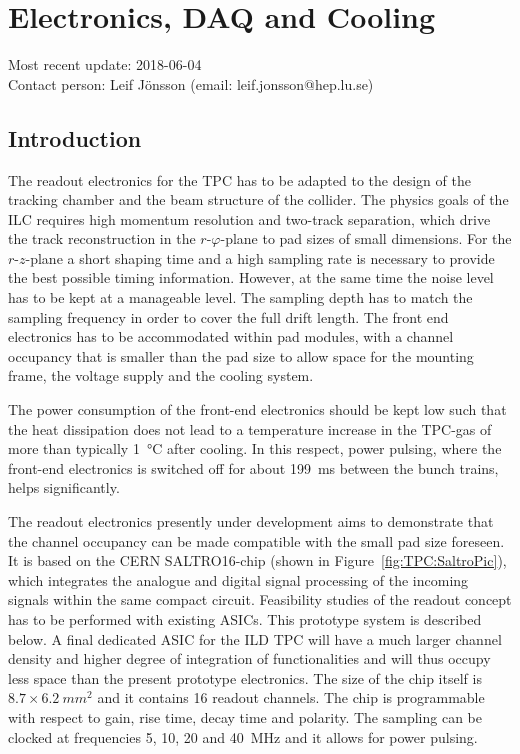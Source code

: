\section{Electronics, DAQ and Cooling}
\label{chap:TPC_sec:electronics}
Most recent update: 2018-06-04 \\
Contact person: Leif J{\"o}nsson (email: leif.jonsson@hep.lu.se)

\subsection{Introduction}
The readout electronics for the TPC has to be adapted to the design of the tracking chamber and the beam structure of the collider. The physics goals of the ILC requires high momentum resolution and two-track separation, which drive the track reconstruction in the $r\text{-}\varphi$-plane to pad sizes of small dimensions. For the $r\text{-}z$-plane a short shaping time and a high sampling rate is necessary to provide the best possible timing information. However, at the same time the noise level has to be kept at a manageable level. The sampling depth has to match the sampling frequency in order to cover the full drift length. The front end electronics has to be accommodated within pad modules, with a channel occupancy that is smaller than the pad size to allow space for the mounting frame, the voltage supply and the cooling system.

The power consumption of the front-end electronics should be kept low such that the heat dissipation does not lead to a temperature increase in the TPC-gas of more than typically \SI{1}{\degreeCelsius} after cooling. In this respect, power pulsing, where the front-end electronics is switched off for about \SI{199}{ms} between the bunch trains, helps significantly.

The readout electronics presently under development aims to demonstrate that the channel occupancy can be made compatible with the small pad size foreseen. It is based on the CERN SALTRO16-chip (shown in Figure~\ref{fig:TPC:SaltroPic}), which integrates the analogue and digital signal processing of the incoming signals within the same compact circuit. Feasibility studies of the readout concept has to be performed with existing ASICs. This prototype system is described below. A final dedicated ASIC for the ILD TPC will have a much larger channel density and higher degree of integration of functionalities and will thus occupy less space than the present prototype electronics. The size of the chip itself is $8.7 \times \SI{6.2}{mm^2}$ and it contains 16 readout channels. The chip is programmable with respect to gain, rise time, decay time and polarity. The sampling can be clocked at frequencies 5, 10, 20 and \SI{40}{MHz} and it allows for power pulsing.

